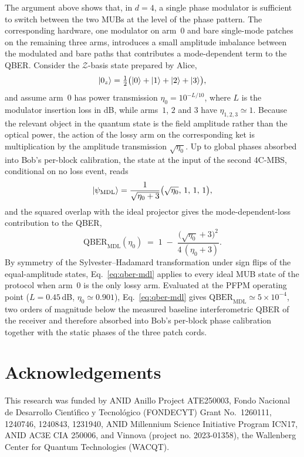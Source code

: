 \documentclass[pra,aps,reprint,nofootinbib,superscriptaddress,floatfix]{revtex4-2}
\begin{document}
The argument above shows that, in $d=4$, a single phase modulator is sufficient to switch between the two MUBs at the level of the phase pattern. The corresponding hardware, one modulator on arm~$0$ and bare single-mode patches on the remaining three arms, introduces a small amplitude imbalance between the modulated and bare paths that contributes a mode-dependent term to the QBER. Consider the $\mathcal{Z}$-basis state prepared by Alice,
\[
\ket{0_z}=\tfrac{1}{2}\bigl(\ket{0}+\ket{1}+\ket{2}+\ket{3}\bigr),
\]
and assume arm~$0$ has power transmission $\eta_0=10^{-L/10}$, where $L$ is the modulator insertion loss in dB, while arms~$1$, $2$ and $3$ have $\eta_{1,2,3}\simeq 1$. Because the relevant object in the quantum state is the field amplitude rather than the optical power, the action of the lossy arm on the corresponding ket is multiplication by the amplitude transmission $\sqrt{\eta_0}$. Up to global phases absorbed into Bob's per-block calibration, the state at the input of the second 4C-MBS, conditional on no loss event, reads
\[
\ket{\psi_{\mathrm{MDL}}}
= \frac{1}{\sqrt{\eta_0+3}}\bigl(\sqrt{\eta_0},\,1,\,1,\,1\bigr),
\]
and the squared overlap with the ideal projector gives the mode-dependent-loss contribution to the QBER,
\begin{equation}
\mathrm{QBER}_{\mathrm{MDL}}(\eta_0)
\;=\;1\;-\;
\frac{\bigl(\sqrt{\eta_0}+3\bigr)^{\!2}}{4\,(\eta_0+3)}.
\label{eq:qber-mdl}
\end{equation}
By symmetry of the Sylvester--Hadamard transformation under sign flips of the equal-amplitude states, Eq.~\eqref{eq:qber-mdl} applies to every ideal MUB state of the protocol when arm~$0$ is the only lossy arm. Evaluated at the PFPM operating point ($L=0.45\,$dB, $\eta_0\simeq 0.901$), Eq.~\eqref{eq:qber-mdl} gives $\mathrm{QBER}_{\mathrm{MDL}}\simeq 5\times 10^{-4}$, two orders of magnitude below the measured baseline interferometric QBER of the receiver and therefore absorbed into Bob's per-block phase calibration together with the static phases of the three patch cords.

\section*{Acknowledgements}

This research was funded by ANID Anillo Project ATE250003, Fondo Nacional de Desarrollo Cient\'{\i}fico y
Tecnol\'ogico (FONDECYT) Grant No.\ 1260111, 1240746, 1240843, 1231940, ANID Millennium Science Initiative Program ICN17, ANID AC3E CIA 250006, and Vinnova (project no. 2023-01358), the Wallenberg Center for Quantum Technologies (WACQT).


\end{document}
